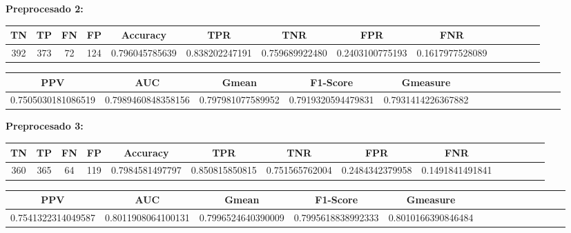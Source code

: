 \documentclass[a4]{article}
\begin{document}
\textbf{Preprocesado 2:}
\begin{center}
\begin{tabular}{|c|c|c|c|c|c|c|c|c|c|c|c|c|c|}
\hline
\multicolumn{1}{|c|}{\textbf{TN}}& \textbf{TP} & \textbf{FN} & \textbf{FP} & \textbf{Accuracy} & \textbf{TPR} & \textbf{TNR} & \textbf{FPR} &\textbf{FNR} \\ \hline
  392 & 373 & 72 & 124 & 0.796045785639 & 0.838202247191 & 0.759689922480 & 0.2403100775193 & 0.1617977528089 \\ \hline
\end{tabular}
\end{center}

\begin{center}
\begin{tabular}{|c|c|c|c|c|c|c|c|c|c|c|c|c|c|}
\hline
\multicolumn{1}{|c|}{\textbf{PPV}} & \textbf{AUC} & \textbf{Gmean} & \textbf{F1-Score} & \textbf{Gmeasure}  \\ \hline
  0.7505030181086519 & 0.7989460848358156 & 0.797981077589952 & 0.7919320594479831 & 0.7931414226367882 \\ \hline
\end{tabular}
\end{center}

\textbf{Preprocesado 3:}
\begin{center}
\begin{tabular}{|c|c|c|c|c|c|c|c|c|c|c|c|c|c|}
\hline
\multicolumn{1}{|c|}{\textbf{TN}}& \textbf{TP} & \textbf{FN} & \textbf{FP} & \textbf{Accuracy} & \textbf{TPR} & \textbf{TNR} & \textbf{FPR} &\textbf{FNR} \\ \hline
  360 & 365 & 64 & 119 & 0.7984581497797 & 0.850815850815 & 0.751565762004 & 0.2484342379958 & 0.1491841491841 \\ \hline
\end{tabular}
\end{center}

\begin{center}
\begin{tabular}{|c|c|c|c|c|c|c|c|c|c|c|c|c|c|}
\hline
\multicolumn{1}{|c|}{\textbf{PPV}} & \textbf{AUC} & \textbf{Gmean} & \textbf{F1-Score} & \textbf{Gmeasure}  \\ \hline
   0.7541322314049587 & 0.8011908064100131 & 0.7996524640390009 & 0.7995618838992333 & 0.8010166390846484 \\ \hline
\end{tabular}
\end{center}

\vspace{1mm}
\end{document}
